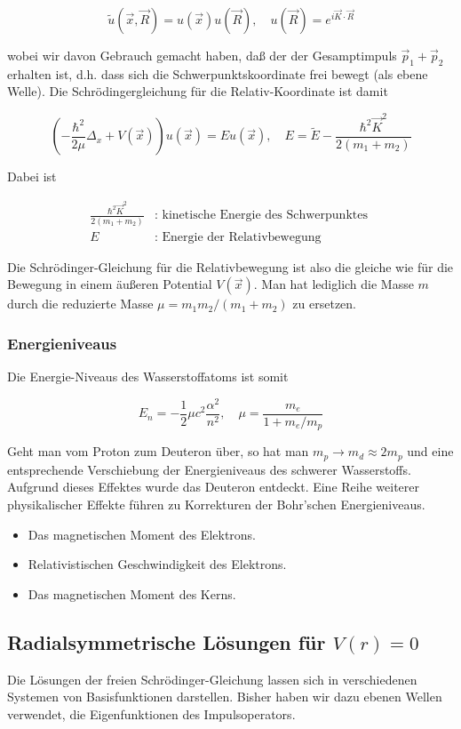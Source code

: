 \documentclass[10pt, letterpaper]{article}
\begin{document}
$$
\tilde{u}(\vec{x}, \vec{R})=u(\vec{x}) u(\vec{R}), \quad u(\vec{R})=e^{i \vec{K} \cdot \vec{R}}
$$

wobei wir davon Gebrauch gemacht haben, daß der der Gesamptimpuls $\vec{p}_{1}+\vec{p}_{2}$ erhalten ist, d.h. dass sich die Schwerpunktskoordinate frei bewegt (als ebene Welle). Die Schrödingergleichung für die Relativ-Koordinate ist damit

$$
\left(-\frac{\hbar^{2}}{2 \mu} \Delta_{x}+V(\vec{x})\right) u(\vec{x})=E u(\vec{x}), \quad E=\tilde{E}-\frac{\hbar^{2} \vec{K}^{2}}{2\left(m_{1}+m_{2}\right)}
$$

Dabei ist

$$
\begin{aligned}
\frac{\hbar^{2} \vec{K}^{2}}{2\left(m_{1}+m_{2}\right)} & : \text { kinetische Energie des Schwerpunktes } \\
E & : \text { Energie der Relativbewegung }
\end{aligned}
$$

Die Schrödinger-Gleichung für die Relativbewegung ist also die gleiche wie für die Bewegung in einem äußeren Potential $V(\vec{x})$. Man hat lediglich die Masse $m$ durch die reduzierte Masse $\mu=m_{1} m_{2} /\left(m_{1}+m_{2}\right)$ zu ersetzen.

\subsubsection*{Energieniveaus}
Die Energie-Niveaus des Wasserstoffatoms ist somit

$$
E_{n}=-\frac{1}{2} \mu c^{2} \frac{\alpha^{2}}{n^{2}}, \quad \mu=\frac{m_{e}}{1+m_{e} / m_{p}}
$$

Geht man vom Proton zum Deuteron über, so hat man $m_{p} \rightarrow m_{d} \approx 2 m_{p}$ und eine entsprechende Verschiebung der Energieniveaus des schwerer Wasserstoffs. Aufgrund dieses Effektes wurde das Deuteron entdeckt. Eine Reihe weiterer physikalischer Effekte führen zu Korrekturen der Bohr'schen Energieniveaus.

\begin{itemize}
  \item Das magnetischen Moment des Elektrons.
  \item Relativistischen Geschwindigkeit des Elektrons.
  \item Das magnetischen Moment des Kerns.
\end{itemize}

\subsection*{Radialsymmetrische Lösungen für $V(r)=0$}
Die Lösungen der freien Schrödinger-Gleichung lassen sich in verschiedenen Systemen von Basisfunktionen darstellen. Bisher haben wir dazu ebenen Wellen verwendet, die Eigenfunktionen des Impulsoperators.
\end{document}
